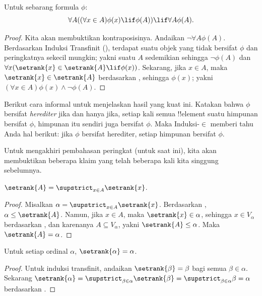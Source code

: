 \documentclass[../../../include/open-logic-section]{subfiles}
\begin{document}
\begin{thm}
Untuk sebarang formula $\phi$:
\[
	\forall A((\forall x \in A)\phi(x) \lif \phi(A)) \lif \forall A \phi(A).
\]
\end{thm}

\begin{proof}
Kita akan membuktikan kontraposisinya. Andaikan
$\lnot \forall A \phi(A)$. Berdasarkan Induksi Transfinit
(), terdapat suatu objek yang
tidak bersifat $\phi$ dan peringkatnya sekecil mungkin; yakni suatu $A$ sedemikian
sehingga $\lnot \phi(A)$ dan
$\forall x(\setrank{x} \in \setrank{A} \lif \phi(x))$. Sekarang, jika
$x \in A$, maka $\setrank{x} \in \setrank{A}$ berdasarkan
, sehingga $\phi(x)$; yakni
$(\forall x \in A)\phi(x) \land \lnot \phi(A)$.
\end{proof}\noindent
Berikut cara informal untuk menjelaskan hasil yang kuat ini. Katakan bahwa
$\phi$ bersifat \emph{herediter} jika dan hanya jika, setiap kali semua
!!{element} suatu himpunan bersifat $\phi$, himpunan itu sendiri juga
bersifat $\phi$. Maka Induksi-$\in$ memberi tahu Anda hal berikut: jika
$\phi$ bersifat herediter, setiap himpunan bersifat $\phi$.

Untuk mengakhiri pembahasan peringkat (untuk saat ini), kita akan membuktikan
beberapa klaim yang telah beberapa kali kita singgung sebelumnya.

\begin{prop}
$\setrank{A} = \supstrict_{x \in A}\setrank{x}$.
\end{prop}

\begin{proof}
Misalkan $\alpha = \supstrict_{x \in A}\setrank{x}$. Berdasarkan
, $\alpha \leq \setrank{A}$. Namun, jika $x \in A$,
maka $\setrank{x} \in \alpha$, sehingga $x \in V_\alpha$ berdasarkan
, dan karenanya $A \subseteq V_\alpha$, yakni
$\setrank{A} \leq \alpha$. Maka $\setrank{A} = \alpha$.
\end{proof}

\begin{cor}
Untuk setiap ordinal $\alpha$, $\setrank{\alpha} = \alpha$.
\end{cor}

\begin{proof}
Untuk induksi transfinit, andaikan $\setrank{\beta} = \beta$ bagi semua
$\beta \in \alpha$. Sekarang
$\setrank{\alpha} = \supstrict_{\beta \in \alpha}\setrank{\beta} =
\supstrict_{\beta \in \alpha}\beta = \alpha$ berdasarkan
.
%
\end{proof}
\end{document}
